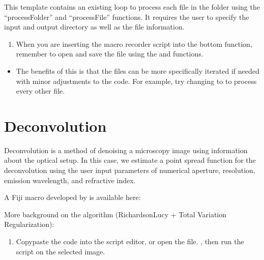 \documentclass[letterpaper,10pt,english]{jupyterBook}
\begin{document}
\sphinxAtStartPar
This template contains an existing loop to process each file in the folder
using the “processFolder” and “processFile” functions. It requires the user
to specify the input and output directory as well as the file information.
\begin{enumerate}
%
\item {} 
\sphinxAtStartPar
When you are inserting the macro recorder script into the bottom
function, remember to open and save the file using the  and  functions.

\end{enumerate}
\begin{itemize}
\item {} 
\sphinxAtStartPar
The benefits of this is that the files can be more specifically iterated if
needed with minor adjustments to the code. For example, try changing  to  to process every other file.

\end{itemize}

\sphinxAtStartPar
{}

\sphinxstepscope


\chapter{Deconvolution}
\label{\detokenize{deconvolution:deconvolution}}\label{\detokenize{deconvolution::doc}}
\sphinxAtStartPar
Deconvolution is a method of denoising a microscopy image using information about the optical
setup. In this case, we estimate a point spread function for the deconvolution using the user
input parameters of numerical aperture, resolution, emission wavelength, and refractive index.

\sphinxAtStartPar
A Fiji macro developed by  is available here:\\

\sphinxAtStartPar
More background on the algorithm (Richardson\sphinxhyphen{}Lucy + Total Variation Regularization):\\
\begin{enumerate}
%
\item {} 
\sphinxAtStartPar
Copy\sphinxhyphen{}paste the code into the script editor, or open the  file. , then run the script on the selected image.

\end{enumerate}
\end{document}
